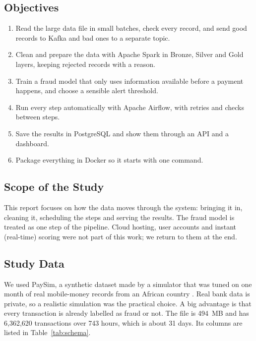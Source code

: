 \documentclass[11pt,a4paper]{article}
\begin{document}
\subsection{Objectives}
\begin{enumerate}
  \item Read the large data file in small batches, check every record, and send
        good records to Kafka and bad ones to a separate topic.
  \item Clean and prepare the data with Apache Spark in Bronze, Silver and Gold
        layers, keeping rejected records with a reason.
  \item Train a fraud model that only uses information available before a
        payment happens, and choose a sensible alert threshold.
  \item Run every step automatically with Apache Airflow, with retries and checks
        between steps.
  \item Save the results in PostgreSQL and show them through an API and a
        dashboard.
  \item Package everything in Docker so it starts with one command.
\end{enumerate}

\subsection{Scope of the Study}
This report focuses on how the data moves through the system: bringing it in,
cleaning it, scheduling the steps and serving the results. The fraud model is
treated as one step of the pipeline. Cloud hosting, user accounts and instant
(real-time) scoring were not part of this work; we return to them at the end.

\subsection{Study Data}
We used PaySim, a synthetic dataset made by a simulator that was tuned on one
month of real mobile-money records from an African country
\citep{lopezrojas2016paysim}. Real bank data is private, so a realistic
simulation was the practical choice. A big advantage is that every transaction
is already labelled as fraud or not. The file is 494~MB and has 6,362,620
transactions over 743 hours, which is about 31 days. Its columns are listed in
Table~\ref{tab:schema}.
\end{document}
